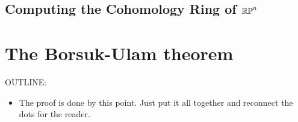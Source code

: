 \documentclass{amsart}
\begin{document}
\subsection{Computing the Cohomology Ring of $\mathbb{RP}^n$}




\section{The Borsuk-Ulam theorem}
\label{sec:borsuk-ulam}

OUTLINE:
\begin{itemize}
\item
  The proof is done by this point. Just put it all
  together and reconnect the dots for the reader.
\end{itemize}



\nocite{shul:bfp,brunerie:thesis,br:rp-hott}


\end{document}
